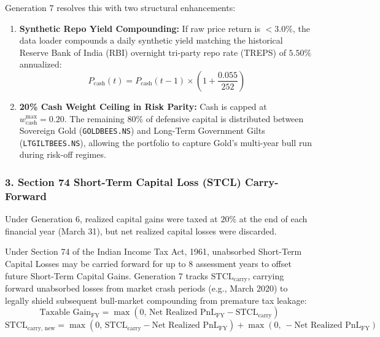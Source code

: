 \documentclass[11pt,a4paper]{article}
\begin{document}
Generation 7 resolves this with two structural enhancements:
\begin{enumerate}
    \item \textbf{Synthetic Repo Yield Compounding:} If raw price return is $<3.0\%$, the data loader compounds a daily synthetic yield matching the historical Reserve Bank of India (RBI) overnight tri-party repo rate (TREPS) of $5.50\%$ annualized:
    \begin{equation}
    P_{\text{cash}}(t) = P_{\text{cash}}(t-1) \times \left(1 + \frac{0.055}{252}\right)
    \end{equation}
    \item \textbf{20\% Cash Weight Ceiling in Risk Parity:} Cash is capped at $w_{\text{cash}}^{\max} = 0.20$. The remaining $80\%$ of defensive capital is distributed between Sovereign Gold (\texttt{GOLDBEES.NS}) and Long-Term Government Gilts (\texttt{LTGILTBEES.NS}), allowing the portfolio to capture Gold's multi-year bull run during risk-off regimes.
\end{enumerate}

\subsubsection{3. Section 74 Short-Term Capital Loss (STCL) Carry-Forward}
Under Generation 6, realized capital gains were taxed at $20\%$ at the end of each financial year (March 31), but net realized capital losses were discarded. 

Under Section 74 of the Indian Income Tax Act, 1961, unabsorbed Short-Term Capital Losses may be carried forward for up to 8 assessment years to offset future Short-Term Capital Gains. Generation 7 tracks $\text{STCL}_{\text{carry}}$, carrying forward unabsorbed losses from market crash periods (e.g., March 2020) to legally shield subsequent bull-market compounding from premature tax leakage:
\begin{equation}
\text{Taxable Gain}_{\text{FY}} = \max\left(0, \, \text{Net Realized PnL}_{\text{FY}} - \text{STCL}_{\text{carry}}\right)
\end{equation}
\begin{equation}
\text{STCL}_{\text{carry, new}} = \max\left(0, \, \text{STCL}_{\text{carry}} - \text{Net Realized PnL}_{\text{FY}}\right) + \max\left(0, \, -\text{Net Realized PnL}_{\text{FY}}\right)
\end{equation}
\end{document}
